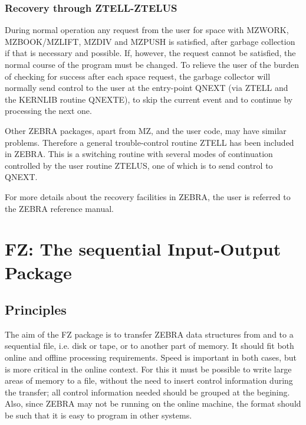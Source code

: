 \subsection{Recovery through ZTELL-ZTELUS}
\par During normal operation any request from the user for space
with MZWORK, MZBOOK/MZLIFT, MZDIV and MZPUSH is satisfied,
after garbage collection if that is necessary and possible.
If, however, the request cannot be satisfied,
the normal course of the program must be changed.
To relieve the user of the burden of checking for success
after each space request,
the garbage collector will normally send control to the user at the
entry-point QNEXT (via ZTELL and the KERNLIB routine QNEXTE),
to skip the current event and to continue
by processing the next one.
\par Other ZEBRA packages, apart from MZ, and the user code, may
have similar problems.
Therefore a general trouble-control routine ZTELL has been
included in ZEBRA.
This is a switching routine with several modes of continuation
controlled by the user routine ZTELUS,
one of which is to send control to QNEXT.
\par For more details about the recovery facilities in ZEBRA, the user
is referred to the ZEBRA reference manual.
\chapter{FZ: The sequential Input-Output Package}
\section{Principles}
\par The aim of the FZ package
is to transfer ZEBRA data structures from and to a sequential file,
i.e. disk or tape, or to another part of memory.
It should fit both online and offline processing requirements.
Speed is important in both cases,
but is more critical in the online context.
For this it must be possible to write large areas of memory
to a file, without the need to insert control information
during the transfer; all control information needed
should be grouped at the begining.
Also, since ZEBRA may not be running on the online machine,
the format should be such that it is easy to program in other systems.
